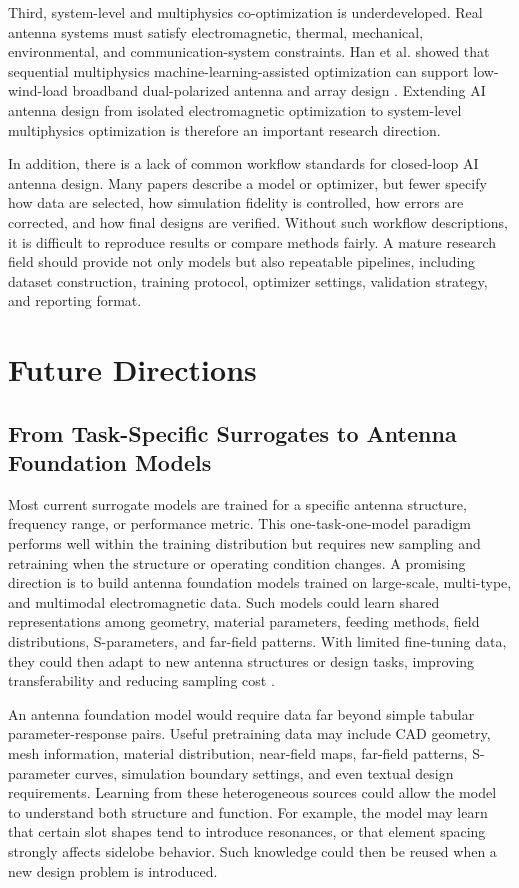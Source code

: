\documentclass{article}
\begin{document}
Third, system-level and multiphysics co-optimization is underdeveloped. Real antenna systems must satisfy electromagnetic, thermal, mechanical, environmental, and communication-system constraints. Han et al. showed that sequential multiphysics machine-learning-assisted optimization can support low-wind-load broadband dual-polarized antenna and array design \cite{han2025multiphysics}. Extending AI antenna design from isolated electromagnetic optimization to system-level multiphysics optimization is therefore an important research direction.

In addition, there is a lack of common workflow standards for closed-loop AI antenna design. Many papers describe a model or optimizer, but fewer specify how data are selected, how simulation fidelity is controlled, how errors are corrected, and how final designs are verified. Without such workflow descriptions, it is difficult to reproduce results or compare methods fairly. A mature research field should provide not only models but also repeatable pipelines, including dataset construction, training protocol, optimizer settings, validation strategy, and reporting format.

\section{Future Directions}

\subsection{From Task-Specific Surrogates to Antenna Foundation Models}

Most current surrogate models are trained for a specific antenna structure, frequency range, or performance metric. This one-task-one-model paradigm performs well within the training distribution but requires new sampling and retraining when the structure or operating condition changes. A promising direction is to build antenna foundation models trained on large-scale, multi-type, and multimodal electromagnetic data. Such models could learn shared representations among geometry, material parameters, feeding methods, field distributions, S-parameters, and far-field patterns. With limited fine-tuning data, they could then adapt to new antenna structures or design tasks, improving transferability and reducing sampling cost \cite{tang2024survey}.

An antenna foundation model would require data far beyond simple tabular parameter-response pairs. Useful pretraining data may include CAD geometry, mesh information, material distribution, near-field maps, far-field patterns, S-parameter curves, simulation boundary settings, and even textual design requirements. Learning from these heterogeneous sources could allow the model to understand both structure and function. For example, the model may learn that certain slot shapes tend to introduce resonances, or that element spacing strongly affects sidelobe behavior. Such knowledge could then be reused when a new design problem is introduced.
\end{document}
